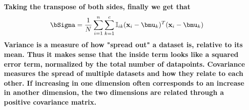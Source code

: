 \documentclass[submit]{harvardml}
\newenvironment{answer}{%
    \color{answergreen}\bf}
  {%
  }
\begin{document}
\begin{enumerate}
\begin{answer}
            Taking the transpose of both sides, finally we get that 
        $$
          \bSigma  =   \frac{1}{N}
            \sum_{i=1}^n \sum_{k=1}^c \mBI (\bx_i - \bmu_k)^T (\bx_i - \bmu_k)
            $$
      Variance is a measure of how "spread out" a dataset is, relative to its
      mean. Thus it makes sense that the inside term looks like a squared error
      term, normalized by the total number of datapoints. Covariance measures the
      spread of multiple datasets and how they relate to each other. If
      increasing in one dimension often corresponds to an increase in
      another dimension, the two dimensions are related through a positive
      covariance matrix. 
      \end{answer}

\end{enumerate}




\end{document}
